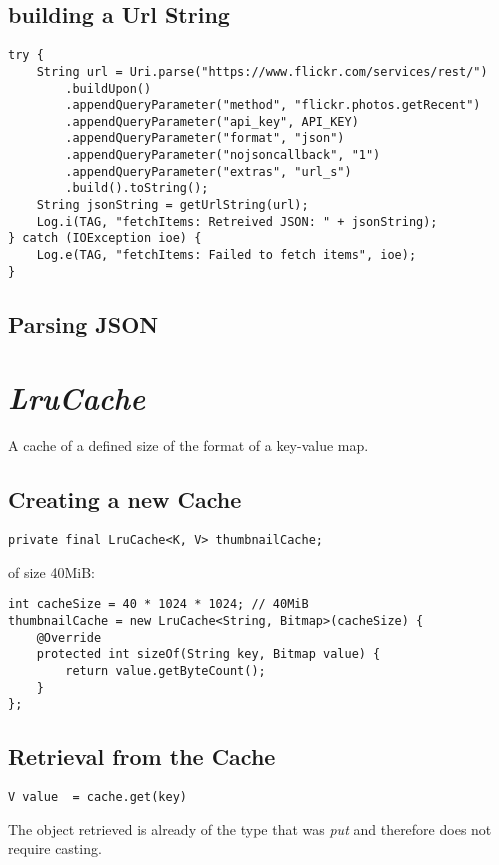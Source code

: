 \documentclass[]{article}
\renewcommand{\it}[1]{\textit{#1}}
\begin{document}
\subsection{building a Url String}
\begin{lstlisting}
try {
	String url = Uri.parse("https://www.flickr.com/services/rest/")
		.buildUpon()
		.appendQueryParameter("method", "flickr.photos.getRecent")
		.appendQueryParameter("api_key", API_KEY)
		.appendQueryParameter("format", "json")
		.appendQueryParameter("nojsoncallback", "1")
		.appendQueryParameter("extras", "url_s")
		.build().toString();
	String jsonString = getUrlString(url);
	Log.i(TAG, "fetchItems: Retreived JSON: " + jsonString);
} catch (IOException ioe) {
	Log.e(TAG, "fetchItems: Failed to fetch items", ioe);
}
\end{lstlisting}

\subsection{Parsing JSON}

\section{\it{LruCache}}
A cache of a defined size of the format of a key-value map.
\subsection{Creating a new Cache}
\begin{lstlisting}
private final LruCache<K, V> thumbnailCache;
\end{lstlisting}
of size 40MiB:
\begin{lstlisting}
int cacheSize = 40 * 1024 * 1024; // 40MiB
thumbnailCache = new LruCache<String, Bitmap>(cacheSize) {
	@Override
	protected int sizeOf(String key, Bitmap value) {
		return value.getByteCount();
	}
};
\end{lstlisting}

\subsection{Retrieval from the Cache}
\begin{lstlisting}
V value  = cache.get(key)
\end{lstlisting}
The object retrieved is already of the type that was \it{put} and therefore does not require casting.
\end{document}
